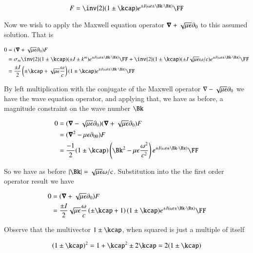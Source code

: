 \begin{align}\label{eqn:transverseWave:fooK}
F = \inv{2}(1 \pm \kcap) e^{\pm I(\omega t \pm \Bk \cdot \Bx)} \FF
\end{align}

Now we wish to apply the Maxwell equation operator $\boldsymbol{\nabla} + \sqrt{\mu\epsilon}\partial_0$ to this assumed solution.  That is

\begin{align*}
0 
&= (\spacegrad + \sqrt{\mu\epsilon}\partial_0) F \\
&= 
\sigma_m \inv{2}(1 \pm \kcap) (\pm I \pm k^m) e^{\pm I(\omega t \pm \Bk \cdot \Bx)} \FF
+ \inv{2}(1 \pm \kcap) (\pm I \sqrt{\mu\epsilon}\omega/c) e^{\pm I(\omega t \pm \Bk \cdot \Bx)} \FF \\
&= 
\frac{\pm I}{2}\left(\pm \kcap + \sqrt{\mu\epsilon}\frac{\omega}{c}\right)(1 \pm \kcap) e^{\pm I(\omega t \pm \Bk \cdot \Bx)} \FF
\end{align*}

By left multiplication with the conjugate of the Maxwell operator $\nabla - \sqrt{\mu\epsilon}\partial_0$ we have the wave equation operator, and applying that, we have as before, a magnitude constraint on the wave number $\Bk$ 

\begin{align*}
0 
&= (\spacegrad - \sqrt{\mu\epsilon}\partial_0) (\spacegrad + \sqrt{\mu\epsilon}\partial_0) F \\
&= (\spacegrad^2 - {\mu\epsilon}\partial_{00}) F \\
&= \frac{-1}{2}(1 \pm \kcap) \left( \Bk^2 - \mu\epsilon\frac{\omega^2}{c^2}\right) e^{\pm I(\omega t \pm \Bk \cdot \Bx)} \FF
\end{align*}

So we have as before $\Abs{\Bk} = \sqrt{\mu\epsilon}\omega/c$.  Substitution into the the first order operator result we have

\begin{align*}
0 
&= (\spacegrad + \sqrt{\mu\epsilon}\partial_0) F \\
&= 
\frac{\pm I}{2}\sqrt{\mu\epsilon}\frac{\omega}{c}\left(\pm \kcap + 1\right)(1 \pm \kcap) e^{\pm I(\omega t \pm \Bk \cdot \Bx)} \FF
\end{align*}

Observe that the multivector $1 \pm \kcap$, when squared is just a multiple of itself

\begin{align*}
(1 \pm \kcap)^2 = 1 + \kcap^2 \pm 2 \kcap = 2 (1 \pm \kcap)
\end{align*}

